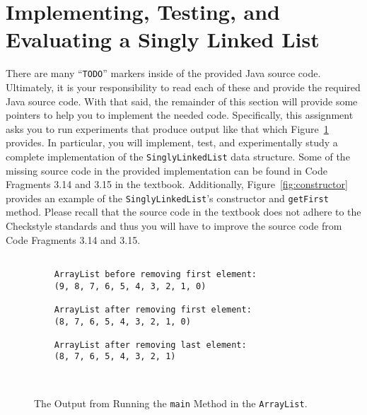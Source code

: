 \documentclass[11pt]{article}
\newcommand{\command}[1]{``\lstinline{#1}''}
\newcommand{\program}[1]{\lstinline{#1}}
\begin{document}
\section*{Implementing, Testing, and Evaluating a Singly Linked List}

There are many \command{TODO} markers inside of the provided Java source code.
Ultimately, it is your responsibility to read each of these and provide the
required Java source code. With that said, the remainder of this section will
provide some pointers to help you to implement the needed code. Specifically,
this assignment asks you to run experiments that produce output like that which
Figure~\ref{fig:output} provides. In particular, you will implement, test, and
experimentally study a complete implementation of the \program{SinglyLinkedList}
data structure. Some of the missing source code in the provided implementation
can be found in Code Fragments 3.14 and 3.15 in the textbook. Additionally,
Figure~\ref{fig:constructor} provides an example of the
\program{SinglyLinkedList}'s constructor and \program{getFirst} method. Please
recall that the source code in the textbook does not adhere to the Checkstyle
standards and thus you will have to improve the source code from Code Fragments
3.14 and 3.15.

  \begin{figure}[t]
    \centering
    \begin{verbatim}

    ArrayList before removing first element:
    (9, 8, 7, 6, 5, 4, 3, 2, 1, 0)

    ArrayList after removing first element:
    (8, 7, 6, 5, 4, 3, 2, 1, 0)

    ArrayList after removing last element:
    (8, 7, 6, 5, 4, 3, 2, 1)

    \end{verbatim}
  \vspace*{-.5in}
  \caption{The Output from Running the \program{main} Method in the
  \program{ArrayList}.}~\label{fig:output}
  \vspace*{-.25in}
\end{figure}
\end{document}
